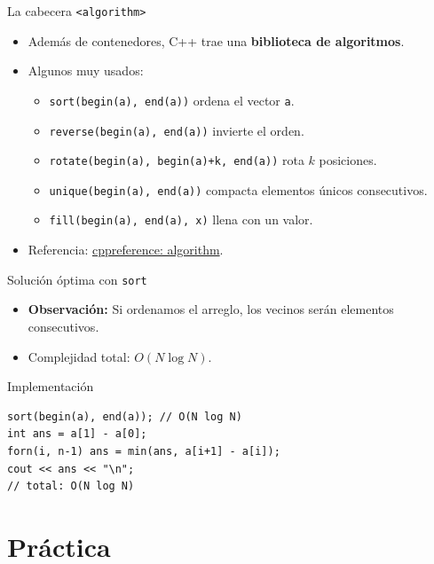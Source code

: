 \documentclass[aspectratio=169]{beamer}
\begin{document}
\begin{frame}{La cabecera \texttt{<algorithm>}}
  \begin{itemize}
    \item Además de contenedores, C++ trae una \textbf{biblioteca de algoritmos}.
    \item Algunos muy usados:
      \begin{itemize}
        \item \texttt{sort(begin(a), end(a))} ordena el vector \texttt{a}.
        \item \texttt{reverse(begin(a), end(a))} invierte el orden.
        \item \texttt{rotate(begin(a), begin(a)+k, end(a))} rota \(k\) posiciones.
        \item \texttt{unique(begin(a), end(a))} compacta elementos únicos consecutivos.
        \item \texttt{fill(begin(a), end(a), x)} llena con un valor.
      \end{itemize}
    \item Referencia: \href{https://en.cppreference.com/w/cpp/algorithm}{cppreference: algorithm}.
  \end{itemize}
\end{frame}

\begin{frame}[fragile]{Solución óptima con \texttt{sort}}
  \begin{itemize}
    \item \textbf{Observación:} Si ordenamos el arreglo, los vecinos serán elementos consecutivos.
    \item Complejidad total: \(O(N \log N)\).
  \end{itemize}
  \begin{block}{Implementación}
  \begin{lstlisting}[style=customc]
sort(begin(a), end(a)); // O(N log N)
int ans = a[1] - a[0];
forn(i, n-1) ans = min(ans, a[i+1] - a[i]);
cout << ans << "\n";
// total: O(N log N)
  \end{lstlisting}
  \end{block}
\end{frame}

\section*{Práctica}
\end{document}
